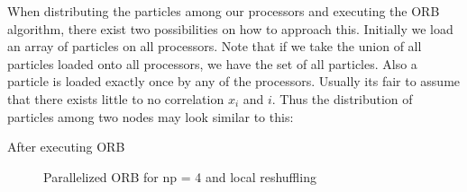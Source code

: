 \documentclass[]{article}
\begin{document}
When distributing the particles among our processors and executing the ORB algorithm, there exist two possibilities on how to approach this. Initially we load an array of particles on all processors. Note that if we take the union of all particles loaded onto all processors, we have the set of all particles. Also a particle is loaded exactly once by any of the processors. Usually its fair to assume that there exists little to no correlation $x_i$ and $i$. Thus the distribution of particles among two nodes may look similar to this:


After executing ORB 

\begin{figure}[H]
	\begin{center}
	\end{center}
	\caption{Parallelized ORB for np = 4 and local reshuffling}
	\label{fig:orb_parallel}
\end{figure}
\end{document}

